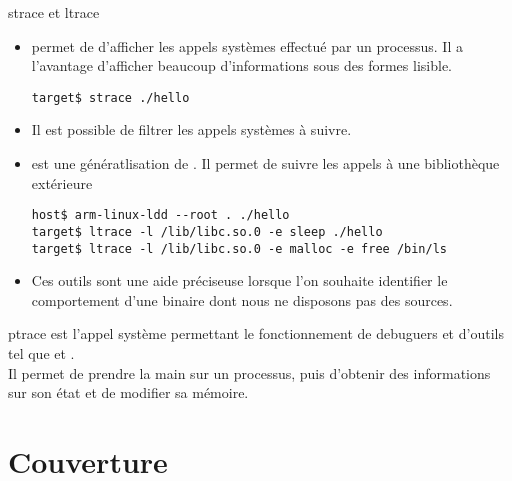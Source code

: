 \begin{frame}[fragile=singleslide]{strace et ltrace}
  \begin{itemize}
  \item {} permet de d'afficher les appels systèmes effectué
    par   un   processus.   Il   a  l'avantage   d'afficher   beaucoup
    d'informations sous des formes lisible.
    \begin{lstlisting} 
target$ strace ./hello
    \end{lstlisting}  
  \item Il est possible de filtrer les appels systèmes à suivre.
  \item  {}  est  une  génératlisation de  .  Il
    permet de suivre les appels à une bibliothèque extérieure
    \begin{lstlisting} 
host$ arm-linux-ldd --root . ./hello
target$ ltrace -l /lib/libc.so.0 -e sleep ./hello
target$ ltrace -l /lib/libc.so.0 -e malloc -e free /bin/ls
    \end{lstlisting}  
  \item  Ces outils  sont une  aide préciseuse  lorsque  l'on souhaite
    identifier le  comportement d'une  binaire dont nous  ne disposons
    pas des sources.
  \end{itemize} 
\end{frame}

\begin{frame}[fragile=singleslide]{ptrace}
    est l'appel  système permettant  le  fonctionnement de
  debuguers et d'outils tel que  et .
  \\[2ex]
  Il permet  de prendre la main  sur un processus,  puis d'obtenir des
  informations sur son état et de modifier sa mémoire.
\end{frame}

\section{Couverture}

